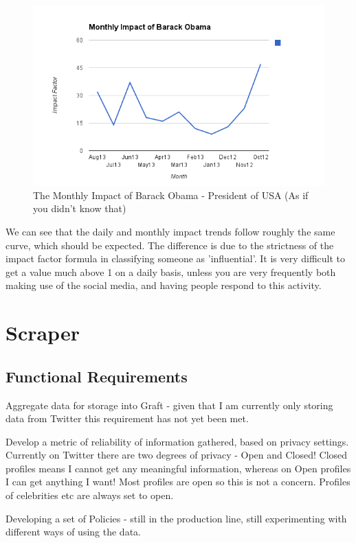 \begin{figure}[h!]
\centering
\includegraphics{Images/monthly_impact_barack_obama.png}
\caption{The Monthly Impact of Barack Obama - President of USA (As if you didn't know that)}
\end{figure}

We can see that the daily and monthly impact trends follow roughly the same curve, which should be expected. The difference is due to the strictness of the impact factor formula in classifying someone as 'influential'. It is very difficult to get a value much above 1 on a daily basis, unless you are very frequently both making use of the social media, and having people respond to this activity. 

\section{Scraper}

\subsection{Functional Requirements}

Aggregate data for storage into Graft - given that I am currently only storing data from Twitter this requirement has not yet been met.

Develop a metric of reliability of information gathered, based on privacy settings. Currently on Twitter there are two degrees of privacy - Open and Closed! Closed profiles means I cannot get any meaningful information, whereas on Open profiles I can get anything I want! Most profiles are open so this is not a concern. Profiles of celebrities etc are always set to open.

Developing a set of Policies - still in the production line, still experimenting with different ways of using the data.

